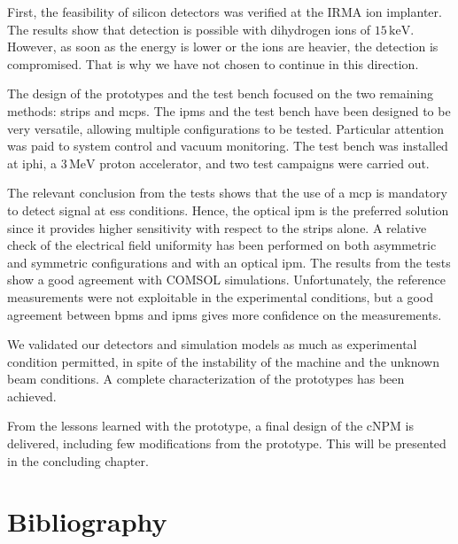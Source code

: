 \begin{refsection}
  First, the feasibility of silicon detectors was verified at the IRMA ion implanter. The results show that detection is possible with dihydrogen ions of $15\,\mathrm{keV}$. However, as soon as the energy is lower or the ions are heavier, the detection is compromised. That is why we have not chosen to continue in this direction.

  The design of the prototypes and the test bench focused on the two remaining methods: strips and \acrshort{mcp}s. The \acrshort{ipm}s and the test bench have been designed to be very versatile, allowing multiple configurations to be tested. Particular attention was paid to system control and vacuum monitoring. The test bench was installed at \acrshort{iphi}, a $3\,\mathrm{MeV}$ proton accelerator, and two test campaigns were carried out.

  The relevant conclusion from the tests shows that the use of a \acrshort{mcp} is mandatory to detect signal at \acrshort{ess} conditions. Hence, the optical \acrshort{ipm} is the preferred solution since it provides higher sensitivity with respect to the strips alone. A relative check of the electrical field uniformity has been performed on both asymmetric and symmetric configurations and with an optical \acrshort{ipm}. The results from the tests show a good agreement with COMSOL simulations.
  Unfortunately, the reference measurements were not exploitable in the experimental conditions, but a good agreement between \acrshort{bpm}s and \acrshort{ipm}s gives more confidence on the measurements.

  We validated our detectors and simulation models as much as experimental condition permitted, in spite of the instability of the machine and the unknown beam conditions. A complete characterization of the prototypes has been achieved.

  From the lessons learned with the prototype, a final design of the cNPM is delivered, including few modifications from the prototype. This will be presented in the concluding chapter.

  \cleardoublepage
  \section{Bibliography}
  \label{ch4:bib}
  \printbibliography[heading=subbibliography]

\end{refsection}

